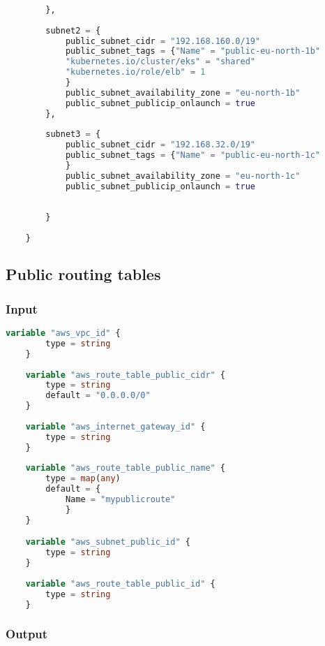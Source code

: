 \begin{lstlisting}[language=terraform]
            
        },
    
        subnet2 = {
            public_subnet_cidr = "192.168.160.0/19"
            public_subnet_tags = {"Name" = "public-eu-north-1b"
            "kubernetes.io/cluster/eks" = "shared"
            "kubernetes.io/role/elb" = 1
            }
            public_subnet_availability_zone = "eu-north-1b"
            public_subnet_publicip_onlaunch = true
        },
    
        subnet3 = {
            public_subnet_cidr = "192.168.32.0/19"
            public_subnet_tags = {"Name" = "public-eu-north-1c"
            }
            public_subnet_availability_zone = "eu-north-1c"
            public_subnet_publicip_onlaunch = true
    
    
        } 
    
    }   
\end{lstlisting}

\subsection{
{Public routing tables}}
\label{sec:Publieke route tabellen}

\subsubsection{
{Input}}

\begin{lstlisting}[language=terraform]
    variable "aws_vpc_id" {
        type = string
    }
    
    variable "aws_route_table_public_cidr" {
        type = string
        default = "0.0.0.0/0"
    }
    
    variable "aws_internet_gateway_id" {
        type = string
    }
    
    variable "aws_route_table_public_name" {
        type = map(any)
        default = {
            Name = "mypublicroute"
            }
    }

    variable "aws_subnet_public_id" {
        type = string
    }
    
    variable "aws_route_table_public_id" {
        type = string
    }    
\end{lstlisting}

\subsubsection{
{Output}}

